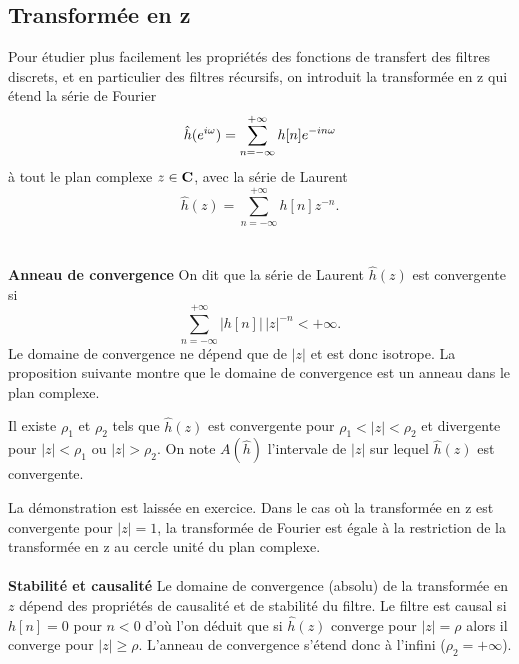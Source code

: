 \subsection{Transform\'ee en z}

Pour \'etudier plus facilement les propri\'et\'es des fonctions
de transfert des filtres discrets, et en particulier des
filtres r\'ecursifs,
on introduit la transform\'ee en z
qui \'etend la s\'erie de Fourier
\begin{equation}
\hat h({e ^{i \omega}}) = \sum_{n=-\infty}^{+\infty} h[n] {e ^{-i n\omega}}
\end{equation}
\`a tout le plan complexe $z \in {\bf{C}}$, avec la s\'erie de Laurent
\begin{equation}
\hat h(z) = \sum_{n=-\infty}^{+\infty} h[n] z^{-n} .
\end{equation}
\\
\\
{\bf Anneau de convergence}
On dit que la s\'erie de Laurent $\hat h(z)$ est convergente si
\[
\sum_{n=-\infty}^{+\infty} |h[n]|\, |z|^{-n} < + \infty .
\]
Le domaine de convergence ne d\'epend que de $|z|$ et est donc
isotrope. La proposition suivante
montre
que le domaine de convergence est un anneau dans le plan complexe.

\begin{proposition}
\label{conv-z}
Il existe $\rho_1$
et $\rho_2$ tels que $\hat h(z)$ est convergente
pour $\rho_1 < |z| < \rho_2$ et divergente
pour $|z| < \rho_1$ ou $|z| > \rho_2$.
On note $A(\hat h)$ l'intervale de $|z|$ sur lequel $\hat h(z)$
est convergente.
\end{proposition}

La d\'emonstration est laiss\'ee en exercice.
Dans le cas o\`u la transform\'ee en z est convergente pour
$|z| = 1$, la transform\'ee de Fourier est \'egale \`a
la restriction
de la transform\'ee en z au cercle unit\'e du plan complexe.
\\
\\
{\bf Stabilit\'e et causalit\'e} Le domaine de convergence (absolu)
de la transform\'ee en $z$ d\'epend des
propri\'et\'es de causalit\'e et de stabilit\'e du filtre.
Le filtre est causal si
$h[n] = 0$ pour $n < 0$ d'o\`u l'on d\'eduit que si
$\hat h (z)$ converge pour $|z| = \rho$ alors il converge pour
$|z| \geq \rho$. L'anneau de convergence s'\'etend donc \`a l'infini
($\rho_2 = +\infty$).

